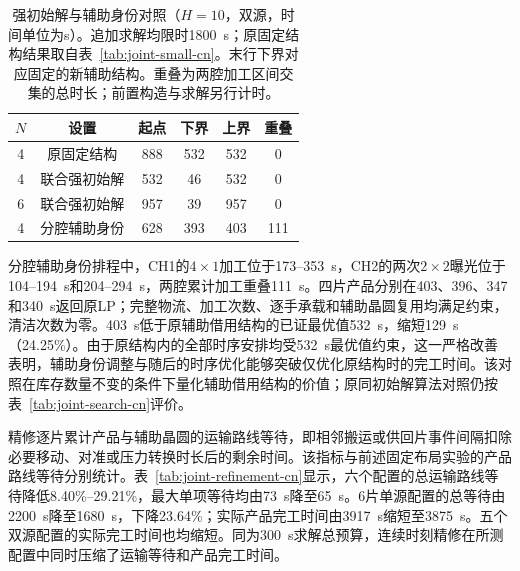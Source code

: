 \documentclass[final,5p,times,twocolumn]{elsarticle}
\begin{document}
\begin{table}[!t]
\centering\scriptsize\setlength{\tabcolsep}{2.5pt}
\caption{强初始解与辅助身份对照（$H=10$，双源，时间单位为s）。追加求解均限时1800~s；原固定结构结果取自表~\ref{tab:joint-small-cn}。末行下界对应固定的新辅助结构。重叠为两腔加工区间交集的总时长；前置构造与求解另行计时。}
\label{tab:joint-auxiliary-cn}
\begin{tabular}{cccccc}\toprule
$N$ & 设置 & 起点 & 下界 & 上界 & 重叠\\\midrule
4 & 原固定结构 & 888 & 532 & 532 & 0\\
4 & 联合强初始解 & 532 & 46 & 532 & 0\\
6 & 联合强初始解 & 957 & 39 & 957 & 0\\
4 & 分腔辅助身份 & 628 & 393 & 403 & 111\\
\bottomrule\end{tabular}\end{table}

分腔辅助身份排程中，CH1的$4\times1$加工位于173--353~s，CH2的两次$2\times2$曝光位于104--194~s和204--294~s，两腔累计加工重叠111~s。四片产品分别在403、396、347和340~s返回原LP；完整物流、加工次数、逐手承载和辅助晶圆复用均满足约束，清洁次数为零。403~s低于原辅助借用结构的已证最优值532~s，缩短129~s（24.25\%）。由于原结构内的全部时序安排均受532~s最优值约束，这一严格改善表明，辅助身份调整与随后的时序优化能够突破仅优化原结构时的完工时间。该对照在库存数量不变的条件下量化辅助借用结构的价值；原同初始解算法对照仍按表~\ref{tab:joint-search-cn}评价。

精修逐片累计产品与辅助晶圆的运输路线等待，即相邻搬运或供回片事件间隔扣除必要移动、对准或压力转换时长后的剩余时间。该指标与前述固定布局实验的产品路线等待分别统计。表~\ref{tab:joint-refinement-cn}显示，六个配置的总运输路线等待降低8.40\%--29.21\%，最大单项等待均由73~s降至65~s。6片单源配置的总等待由2200~s降至1680~s，下降23.64\%；实际产品完工时间由3917~s缩短至3875~s。五个双源配置的实际完工时间也均缩短。同为300~s求解总预算，连续时刻精修在所测配置中同时压缩了运输等待和产品完工时间。
\end{document}
